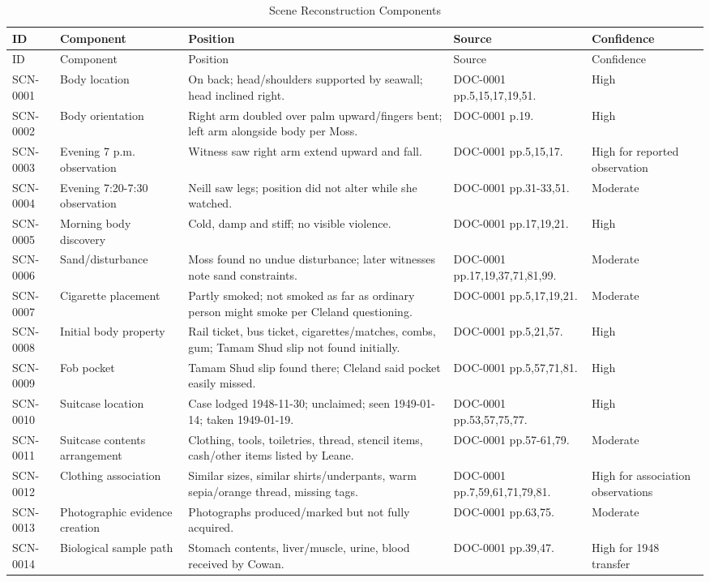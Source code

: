 \begin{longtable}{p{}p{}p{}p{}p{}}
\caption{Scene Reconstruction Components}\label{tab:scene-reconstruction}\\
\toprule
ID & Component & Position & Source & Confidence \\
\midrule
\endfirsthead
\toprule
ID & Component & Position & Source & Confidence \\
\midrule
\endhead
SCN-0001 & Body location & On back; head/shoulders supported by seawall; head inclined right. & DOC-0001 pp.5,15,17,19,51. & High \\
SCN-0002 & Body orientation & Right arm doubled over palm upward/fingers bent; left arm alongside body per Moss. & DOC-0001 p.19. & High \\
SCN-0003 & Evening 7 p.m. observation & Witness saw right arm extend upward and fall. & DOC-0001 pp.5,15,17. & High for reported observation \\
SCN-0004 & Evening 7:20-7:30 observation & Neill saw legs; position did not alter while she watched. & DOC-0001 pp.31-33,51. & Moderate \\
SCN-0005 & Morning body discovery & Cold, damp and stiff; no visible violence. & DOC-0001 pp.17,19,21. & High \\
SCN-0006 & Sand/disturbance & Moss found no undue disturbance; later witnesses note sand constraints. & DOC-0001 pp.17,19,37,71,81,99. & Moderate \\
SCN-0007 & Cigarette placement & Partly smoked; not smoked as far as ordinary person might smoke per Cleland questioning. & DOC-0001 pp.5,17,19,21. & Moderate \\
SCN-0008 & Initial body property & Rail ticket, bus ticket, cigarettes/matches, combs, gum; Tamam Shud slip not found initially. & DOC-0001 pp.5,21,57. & High \\
SCN-0009 & Fob pocket & Tamam Shud slip found there; Cleland said pocket easily missed. & DOC-0001 pp.5,57,71,81. & High \\
SCN-0010 & Suitcase location & Case lodged 1948-11-30; unclaimed; seen 1949-01-14; taken 1949-01-19. & DOC-0001 pp.53,57,75,77. & High \\
SCN-0011 & Suitcase contents arrangement & Clothing, tools, toiletries, thread, stencil items, cash/other items listed by Leane. & DOC-0001 pp.57-61,79. & Moderate \\
SCN-0012 & Clothing association & Similar sizes, similar shirts/underpants, warm sepia/orange thread, missing tags. & DOC-0001 pp.7,59,61,71,79,81. & High for association observations \\
SCN-0013 & Photographic evidence creation & Photographs produced/marked but not fully acquired. & DOC-0001 pp.63,75. & Moderate \\
SCN-0014 & Biological sample path & Stomach contents, liver/muscle, urine, blood received by Cowan. & DOC-0001 pp.39,47. & High for 1948 transfer \\
\bottomrule
\end{longtable}
